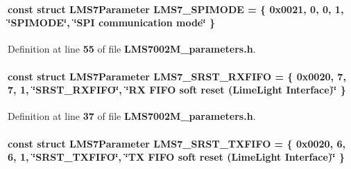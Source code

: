 \paragraph[{L\+M\+S7\+\_\+\+S\+P\+I\+M\+O\+DE}]{\setlength{\rightskip}{0pt plus 5cm}const struct {\bf L\+M\+S7\+Parameter} L\+M\+S7\+\_\+\+S\+P\+I\+M\+O\+DE = \{ 0x0021, 0, 0, 1, \char`\"{}\+S\+P\+I\+M\+O\+D\+E\char`\"{}, \char`\"{}\+S\+P\+I communication mode\char`\"{} \}\hspace{0.3cm}{\ttfamily [static]}}\label{LMS7002M__parameters_8h_ae343ca97bd05d3bd4843e160d43db147}


Definition at line {\bf 55} of file {\bf L\+M\+S7002\+M\+\_\+parameters.\+h}.

\paragraph[{L\+M\+S7\+\_\+\+S\+R\+S\+T\+\_\+\+R\+X\+F\+I\+FO}]{\setlength{\rightskip}{0pt plus 5cm}const struct {\bf L\+M\+S7\+Parameter} L\+M\+S7\+\_\+\+S\+R\+S\+T\+\_\+\+R\+X\+F\+I\+FO = \{ 0x0020, 7, 7, 1, \char`\"{}\+S\+R\+S\+T\+\_\+\+R\+X\+F\+I\+F\+O\char`\"{}, \char`\"{}\+R\+X F\+I\+F\+O soft reset (\+Lime\+Light Interface)\char`\"{} \}\hspace{0.3cm}{\ttfamily [static]}}\label{LMS7002M__parameters_8h_a38a98c85488b58af50bc4d6689fe84fe}


Definition at line {\bf 37} of file {\bf L\+M\+S7002\+M\+\_\+parameters.\+h}.

\paragraph[{L\+M\+S7\+\_\+\+S\+R\+S\+T\+\_\+\+T\+X\+F\+I\+FO}]{\setlength{\rightskip}{0pt plus 5cm}const struct {\bf L\+M\+S7\+Parameter} L\+M\+S7\+\_\+\+S\+R\+S\+T\+\_\+\+T\+X\+F\+I\+FO = \{ 0x0020, 6, 6, 1, \char`\"{}\+S\+R\+S\+T\+\_\+\+T\+X\+F\+I\+F\+O\char`\"{}, \char`\"{}\+T\+X F\+I\+F\+O soft reset (\+Lime\+Light Interface)\char`\"{} \}\hspace{0.3cm}{\ttfamily [static]}}\label{LMS7002M__parameters_8h_a59aaffb5bce932cb0c70eda2f06b68ec}


